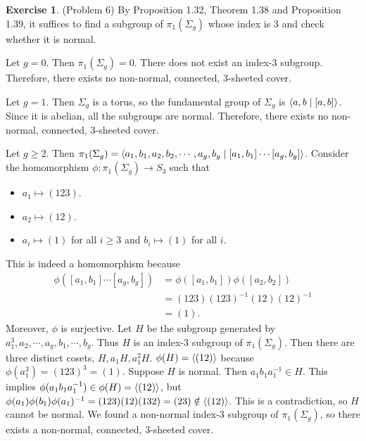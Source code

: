 \documentclass[12pt, psamsfonts]{amsart}
\theoremstyle{definition}
\newtheorem*{exer}{Exercise}
\theoremstyle{remark}
\numberwithin{equation}{section}
\begin{document}
\begin{exer}{(Problem 6)}
  By Proposition 1.32, Theorem 1.38 and Proposition 1.39, it suffices to find a subgroup of $\pi_1(\Sigma_g)$ whose index is 3 and check whether it is normal.

  Let $g = 0$.
  Then $\pi_1(\Sigma_g) = 0$.
  There does not exist an index-3 subgroup.
  Therefore, there exists no non-normal, connected, 3-sheeted cover.

  Let $g = 1$.
  Then $\Sigma_g$ is a torus, so the fundamental group of $\Sigma_g$ is $\ev{ a, b \mid [a, b] }$.
  Since it is abelian, all the subgroups are normal.
  Therefore, there exists no non-normal, connected, 3-sheeted cover.

  Let $g \geq 2$.
  Then $\pi_1(\Sigma_g) = \ev{a_1, b_1, a_2, b_2, \cdots, a_g, b_g \mid [a_1, b_1] \cdots [a_g, b_g]}$.
  Consider the homomorphism $\phi: \pi_1(\Sigma_g) \rightarrow S_3$ such that
  \begin{itemize}
    \item
      $a_1 \mapsto (123)$.
    \item
      $a_2 \mapsto (12)$.
    \item
      $a_i \mapsto (1)$ for all $i \geq 3$ and $b_i \mapsto (1)$ for all $i$.
  \end{itemize}
  This is indeed a homomorphism because 
  \begin{align*}
    \phi([a_1, b_1] \cdots [a_g, b_g])
        &= \phi([a_1, b_1])\phi([a_2, b_2]) \\
        &= (123)(123)^{-1}(12)(12)^{-1} \\
        &= (1).
  \end{align*}
  Moreover, $\phi$ is surjective.
  Let $H$ be the subgroup generated by $a_1^3, a_2, \cdots, a_g, b_1, \cdots, b_g$.
  Thus $H$ is an index-3 subgroup of $\pi_1(\Sigma_g)$.
  Then there are three distinct cosets, $H, a_1H, a_1^2H$.
  $\phi(H) = \ev{(12)}$ because $\phi(a_1^3) = (123)^3 = (1)$.
  Suppose $H$ is normal.
  Then $a_1b_1a_1^{-1} \in H$.
  This implies $\phi(a_1b_1a_1^{-1}) \in \phi(H) = \ev{(12)}$, but $\phi(a_1)\phi(b_1)\phi(a_1)^{-1} = (123)(12)(132) = (23) \notin \ev{(12)}$.
  This is a contradiction, so $H$ cannot be normal.
  We found a non-normal index-3 subgroup of $\pi_1(\Sigma_g)$, so there exists a non-normal, connected, 3-sheeted cover.
\end{exer}
\end{document}
